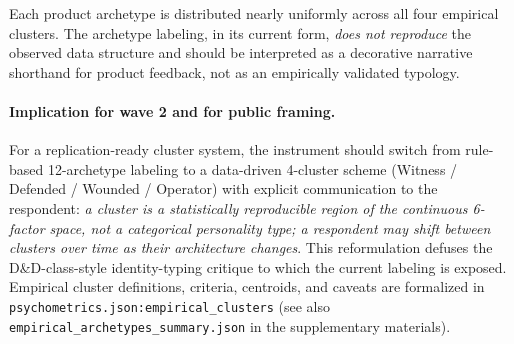 Each product archetype is distributed nearly uniformly across all four empirical clusters. The archetype labeling, in its current form, \emph{does not reproduce} the observed data structure and should be interpreted as a decorative narrative shorthand for product feedback, not as an empirically validated typology.

\paragraph{Implication for wave 2 and for public framing.} For a replication-ready cluster system, the instrument should switch from rule-based 12-archetype labeling to a data-driven 4-cluster scheme (Witness / Defended / Wounded / Operator) with explicit communication to the respondent: \emph{a cluster is a statistically reproducible region of the continuous 6-factor space, not a categorical personality type; a respondent may shift between clusters over time as their architecture changes}. This reformulation defuses the D\&D-class-style identity-typing critique to which the current labeling is exposed. Empirical cluster definitions, criteria, centroids, and caveats are formalized in \texttt{psychometrics.json:empirical\_clusters} (see also \texttt{empirical\_archetypes\_summary.json} in the supplementary materials).
